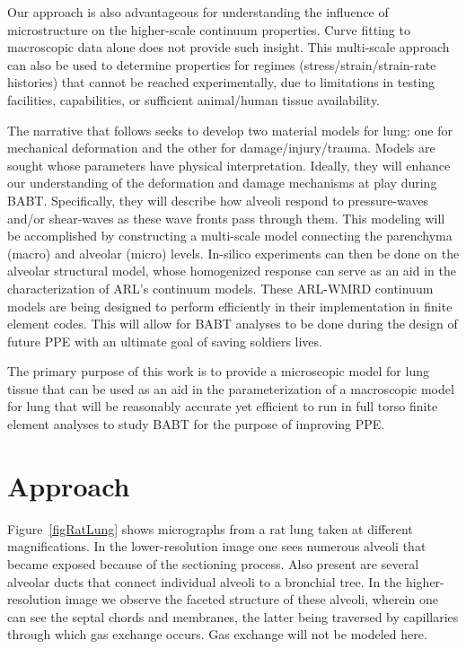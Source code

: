 Our approach is also advantageous for understanding the influence of microstructure on the higher-scale continuum properties.  Curve fitting to macroscopic data alone does not provide such insight.  This multi-scale approach can also be used to determine properties for regimes (stress\slash strain\slash strain-rate histories) that cannot be reached experimentally, due to limitations in testing facilities, capabilities, or sufficient animal\slash human tissue availability. 

The narrative that follows seeks to develop two material models for lung: one for mechanical deformation and the other for damage\slash injury\slash trauma.  Models are sought whose parameters have physical interpretation.  Ideally, they will enhance our understanding of the deformation and damage mechanisms at play during BABT.  Specifically, they will describe how alveoli respond to pressure-waves and\slash or shear-waves as these wave fronts pass through them.  This modeling will be accomplished by constructing a multi-scale model connecting the parenchyma (macro) and alveolar (micro) levels.  In-silico experiments can then be done on the alveolar structural model, whose homogenized response can serve as an aid in the characterization of ARL's continuum models.  These ARL-WMRD continuum models are being designed to perform efficiently in their implementation in finite element codes.  This will allow for BABT analyses to be done during the design of future PPE with an ultimate goal of saving soldiers lives.

The primary purpose of this work is to provide a micro\-scopic model for lung tissue that can be used as an aid in the parameterization of a macro\-scopic model for lung that will be reasonably accurate yet efficient to run in full torso finite element analyses to study BABT for the purpose of improving PPE.

\section{Approach}

Figure~\ref{figRatLung} shows micrographs from a rat lung taken at different magnifications. In the lower-resolution image one sees numerous alveoli that became exposed because of the sectioning process.  Also present are several alveolar ducts that connect individual alveoli to a bronchial tree.  In the higher-resolution image we observe the faceted structure of these alveoli, wherein one can see the septal chords and membranes, the latter being traversed by capillaries through which gas exchange occurs.  Gas exchange will not be modeled here.

